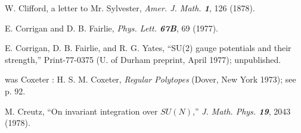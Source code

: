  W. Clifford,
    a letter to Mr. Sylvester,
    {\em Amer. J. Math. \bf 1}, 126 (1878). %

%


E. Corrigan and D. B. Fairlie,
{\em Phys. Lett.  \bf 67B}, 69 (1977).

 E. Corrigan, D. B. Fairlie, and R. G. Yates,
``SU(2) gauge potentials and their strength,''
Print-77-0375 (U. of Durham preprint, April 1977);
unpublished.

was Coxeter :
 H. S. M. Coxeter,
    {\em Regular Polytopes}
    (Dover, New York 1973); see p. 92.


 M. Creutz,
    ``On invariant integration over $SU(N)$,''
    {\em J. Math. Phys. \bf 19}, 2043 (1978). %

